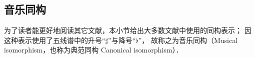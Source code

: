 




\subsection{音乐同构}\label{chrg:sec_music-iso}
为了读者能更好地阅读其它文献，本小节给出大多数文献中使用的同构表示；
因这种表示使用了五线谱中的升号“$\sharp$”与降号“$\flat$”，
故称之为{\heiti 音乐同构}（Musical isomorphism，也称为典范同构 Canonical isomorphism）．


